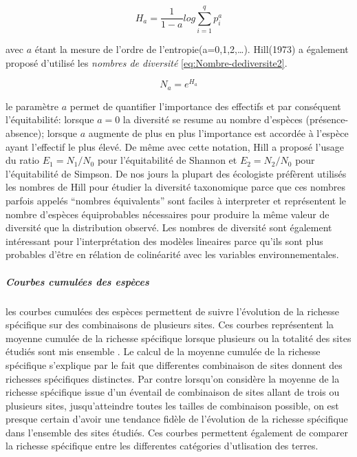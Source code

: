 \documentclass[
  12pt,
  a4paper,
  extrafontsizes,
  onecolumn,
  openright]{book}
\theoremstyle{definition}
\theoremstyle{definition}
\theoremstyle{definition}
\theoremstyle{definition}
\theoremstyle{remark}
\begin{document}
\begin{equation}
H_a=\frac{1}{1-a}log\sum_{i=1}^qp_i^a
\label{eq:Equation-deRenyi}
\end{equation}

avec \(a\) étant la mesure de l'ordre de l'entropie(a=0,1,2,\ldots). Hill(1973) a également proposé d'utilisé les \emph{nombres de diversité} \eqref{eq:Nombre-dediversite2}.

\begin{equation}
N_a=e^{H_a}
\label{eq:Nombre-dediversite2}
\end{equation}

le paramètre \(a\) permet de quantifier l'importance des effectifs et par conséquent l'équitabilité: lorsque \(a=0\) la diversité se resume au nombre d'espèces (présence-absence); lorsque \(a\) augmente de plus en plus l'importance est accordée à l'espèce ayant l'effectif le plus élevé. De même avec cette notation, Hill a proposé l'usage du ratio \(E_1={N_1}/{N_0}\) pour l'équitabilité de Shannon et \(E_2={N_2}/{N_0}\) pour l'équitabilité de Simpson. De nos jours la plupart des écologiste préfèrent utilisés les nombres de Hill pour étudier la diversité taxonomique parce que ces nombres parfois appelés \enquote{nombres équivalents} sont faciles à interpreter et représentent le nombre d'espèces équiprobables nécessaires pour produire la même valeur de diversité que la distribution observé. Les nombres de diversité sont également intéressant pour l'interprétation des modèles lineaires parce qu'ils sont plus probables d'être en rélation de colinéarité avec les variables environnementales.

\hypertarget{courbes-cumuluxe9es-des-espuxe8ces}{%
\subparagraph{Courbes cumulées des espèces}\label{courbes-cumuluxe9es-des-espuxe8ces}}

les courbes cumulées des espèces permettent de suivre l'évolution de la richesse spécifique sur des combinaisons de plusieurs sites. Ces courbes représentent la moyenne cumulée de la richesse spécifique lorsque plusieurs ou la totalité des sites étudiés sont mis ensemble \citep{Kindt_Coe2005}. Le calcul de la moyenne cumulée de la richesse spécifique s'explique par le fait que differentes combinaison de sites donnent des richesses spécifiques distinctes. Par contre lorsqu'on considère la moyenne de la richesse spécifique issue d'un éventail de combinaison de sites allant de trois ou plusieurs sites, jusqu'atteindre toutes les tailles de combinaison possible, on est presque certain d'avoir une tendance fidèle de l'évolution de la richesse spécifique dans l'ensemble des sites étudiés. Ces courbes permettent également de comparer la richesse spécifique entre les differentes catégories d'utlisation des terres.
\end{document}
